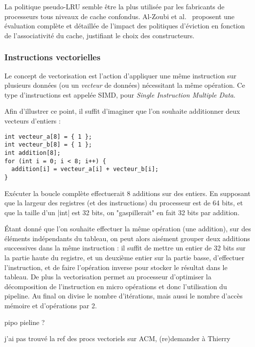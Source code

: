La politique pseudo-LRU semble être la plus utilisée par les fabricants de processeurs tous niveaux de cache confondus. Al-Zoubi et al.~\cite{Al-Zoubi2004} proposent une évaluation complète et détaillée de l'impact des politiques d'éviction en fonction de l'associativité du cache, justifiant le choix des constructeurs.


\subsubsection{Instructions vectorielles}\label{sec:context:numa:simd}

Le concept de vectorisation est l'action d'appliquer une même instruction sur plusieurs données (ou un \emph{vecteur} de données) nécessitant la même opération.
Ce type d'instructions est appelée SIMD, pour \emph{Single Instruction Multiple Data}.

Afin d'illustrer ce point, il suffit d'imaginer que l'on souhaite additionner deux vecteurs d'entiers :
\begin{lstlisting}
int vecteur_a[8] = { 1 };
int vecteur_b[8] = { 1 };
int addition[8];
for (int i = 0; i < 8; i++) {
  addition[i] = vecteur_a[i] + vecteur_b[i];
}
\end{lstlisting}

Exécuter la boucle complète effectuerait 8 additions sur des entiers.
En supposant que la largeur des registres (et des instructions) du processeur est de 64 bits, et que la taille d'un |int| est 32 bits, on "gaspillerait" en fait 32 bits par addition.

Étant donné que l'on souhaite effectuer la même opération (une addition), sur des éléments indépendants du tableau, on peut alors aisément grouper deux additions successives dans la même instruction : il suffit de mettre un entier de 32 bits sur la partie haute du registre, et un deuxième entier sur la partie basse, d'effectuer l'instruction, et de faire l'opération inverse pour stocker le résultat dans le tableau.
De plus la vectorisation permet au processeur d'optimiser la décomposition de l'instruction en micro opérations et donc l'utilisation du pipeline.
Au final on divise le nombre d'itérations, mais aussi le nombre d'accès mémoire et d'opérations par 2.


\begin{todo}
  pipo pieline ?
\end{todo}

\begin{todo}
  j'ai pas trouvé la ref des procs vectoriels sur ACM, (re)demander à Thierry
\end{todo}


